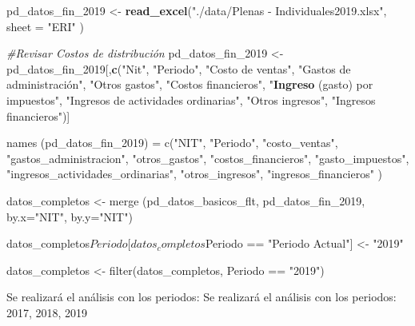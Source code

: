 \documentclass[
  11pt,
  a4paper,
]{book}
\newenvironment{Shaded}{\begin{snugshade}}{\end{snugshade}}
\newcommand{\CommentTok}[1]{\textcolor[rgb]{0.56,0.35,0.01}{\textit{#1}}}
\newcommand{\DataTypeTok}[1]{\textcolor[rgb]{0.13,0.29,0.53}{#1}}
\newcommand{\DecValTok}[1]{\textcolor[rgb]{0.00,0.00,0.81}{#1}}
\newcommand{\KeywordTok}[1]{\textcolor[rgb]{0.13,0.29,0.53}{\textbf{#1}}}
\newcommand{\NormalTok}[1]{#1}
\newcommand{\StringTok}[1]{\textcolor[rgb]{0.31,0.60,0.02}{#1}}
\begin{document}
\begin{Shaded}
\begin{Highlighting}[]
\NormalTok{pd_datos_fin_}\DecValTok{2019}\NormalTok{ <-}\StringTok{ }\KeywordTok{read_excel}\NormalTok{(}\StringTok{"./data/Plenas - Individuales2019.xlsx"}\NormalTok{,}
                                \DataTypeTok{sheet =} \StringTok{"ERI"}\NormalTok{ )}

\CommentTok{#Revisar Costos de distribución}
\NormalTok{pd_datos_fin_}\DecValTok{2019}\NormalTok{ <-}\StringTok{ }\NormalTok{pd_datos_fin_}\DecValTok{2019}\NormalTok{[,}\KeywordTok{c}\NormalTok{(}\StringTok{"Nit"}\NormalTok{, }\StringTok{"Periodo"}\NormalTok{, }\StringTok{"Costo de ventas"}\NormalTok{, }
  \StringTok{"Gastos de administración", "}\NormalTok{Otros gastos}\StringTok{", "}\NormalTok{Costos financieros}\StringTok{", }
\StringTok{  "}\KeywordTok{Ingreso}\NormalTok{ (gasto) por impuestos}\StringTok{", "}\NormalTok{Ingresos de actividades ordinarias}\StringTok{", }
\StringTok{  "}\NormalTok{Otros ingresos}\StringTok{", "}\NormalTok{Ingresos financieros}\StringTok{")]}

\StringTok{names (pd_datos_fin_2019) = c("}\NormalTok{NIT}\StringTok{", "}\NormalTok{Periodo}\StringTok{", "}\NormalTok{costo_ventas}\StringTok{", }
\StringTok{  "}\NormalTok{gastos_administracion}\StringTok{", "}\NormalTok{otros_gastos}\StringTok{", "}\NormalTok{costos_financieros}\StringTok{", }
\StringTok{  "}\NormalTok{gasto_impuestos}\StringTok{", "}\NormalTok{ingresos_actividades_ordinarias}\StringTok{", "}\NormalTok{otros_ingresos}\StringTok{",}
\StringTok{  "}\NormalTok{ingresos_financieros}\StringTok{" )}

\StringTok{datos_completos <- merge (pd_datos_basicos_flt, pd_datos_fin_2019,}
\StringTok{                          by.x="}\NormalTok{NIT}\StringTok{", by.y="}\NormalTok{NIT}\StringTok{")}

\StringTok{datos_completos$Periodo[datos_completos$Periodo == "}\NormalTok{Periodo Actual}\StringTok{"] <- "}\DecValTok{2019}\StringTok{"}

\StringTok{datos_completos <- filter(datos_completos, Periodo == "}\DecValTok{2019}\StringTok{")}
\end{Highlighting}
\end{Shaded}

Se realizará el análisis con los periodos: Se realizará el análisis con
los periodos: 2017, 2018, 2019
\end{document}
